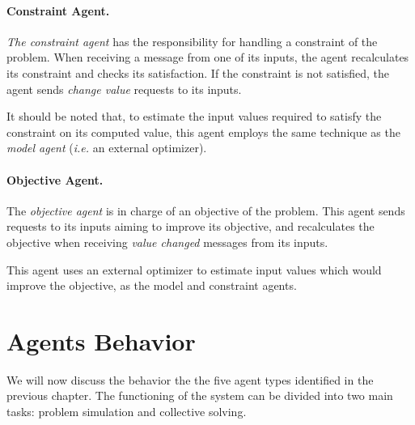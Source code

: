 
\subsubsection*{Constraint Agent.}
 \emph{The constraint agent} has the responsibility for handling a constraint of the problem. When receiving a message from one of its inputs, the agent recalculates its constraint and checks its satisfaction. If the constraint is not satisfied, the agent sends \emph{change value} requests to its inputs.


It should be noted that, to estimate the input values required to satisfy the constraint on its computed value, this agent employs the same technique as the \emph{model agent} (\textit{i.e.} an external optimizer).

\subsubsection*{Objective Agent.}
The  \emph{objective agent} is in charge of an objective of the problem. This agent sends requests to its inputs aiming to improve its objective, and recalculates the objective when receiving  \emph{value changed} messages from its inputs.

This agent uses an external optimizer to estimate input values which would improve the objective, as the model and constraint agents.


\chapter{Agents Behavior}

We will now discuss the behavior the the five agent types identified in the previous chapter. The functioning of the system can be divided into two main tasks: problem simulation and collective solving.

